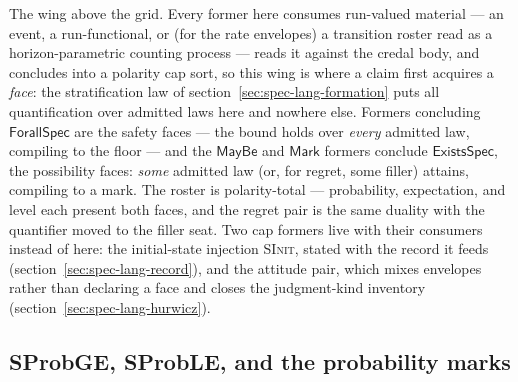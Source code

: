 The wing above the grid. Every former here consumes run-valued
material --- an event, a run-functional, or (for the rate
envelopes) a transition roster read as a horizon-parametric
counting process --- reads it against the
credal body, and concludes into a polarity cap sort, so this wing is
where a claim first acquires a \emph{face}: the stratification law
of section~\ref{sec:spec-lang-formation} puts all quantification
over admitted laws here and nowhere else. Formers concluding
$\mathsf{ForallSpec}$ are the safety faces --- the bound holds over
\emph{every} admitted law, compiling to the floor --- and the
$\mathsf{MayBe}$ and $\mathsf{Mark}$ formers conclude
$\mathsf{ExistsSpec}$, the possibility faces: \emph{some} admitted
law (or, for regret, some filler) attains, compiling to a mark. The
roster is polarity-total --- probability, expectation, and level
each present both faces, and the regret pair is the same duality
with the quantifier moved to the filler seat. Two cap formers live
with their consumers instead of here: the initial-state injection
\textsc{SInit}, stated with the record it feeds
(section~\ref{sec:spec-lang-record}), and the attitude pair, which
mixes envelopes rather than declaring a face and closes the
judgment-kind inventory (section~\ref{sec:spec-lang-hurwicz}).

\subsection{SProbGE, SProbLE, and the probability marks}
\label{sec:spec-lang-prob}


